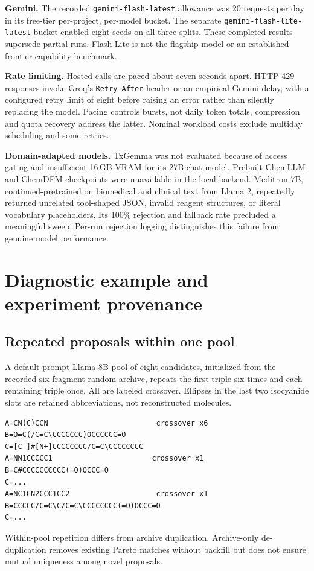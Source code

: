 \textbf{Gemini.} The recorded \texttt{gemini-flash-latest} allowance was 20 requests per day in its free-tier per-project, per-model bucket. The separate \texttt{gemini-flash-lite-latest} bucket enabled eight seeds on all three splits. These completed results supersede partial runs. Flash-Lite is not the flagship model or an established frontier-capability benchmark.

\textbf{Rate limiting.} Hosted calls are paced about seven seconds apart. HTTP 429 responses invoke Groq's \texttt{Retry-After} header or an empirical Gemini delay, with a configured retry limit of eight before raising an error rather than silently replacing the model. Pacing controls bursts, not daily token totals, compression and quota recovery address the latter. Nominal workload costs exclude multiday scheduling and some retries.

\textbf{Domain-adapted models.} TxGemma was not evaluated because of access gating and insufficient 16\,GB VRAM for its 27B chat model. Prebuilt ChemLLM and ChemDFM checkpoints were unavailable in the local backend. Meditron 7B, continued-pretrained on biomedical and clinical text from Llama 2, repeatedly returned unrelated tool-shaped JSON, invalid reagent structures, or literal vocabulary placeholders. Its 100\% rejection and fallback rate precluded a meaningful sweep. Per-run rejection logging distinguishes this failure from genuine model performance.

\section{Diagnostic example and experiment provenance}
\label{app:example}
\subsection{Repeated proposals within one pool}
A default-prompt Llama 8B pool of eight candidates, initialized from the recorded six-fragment random archive, repeats the first triple six times and each remaining triple once. All are labeled crossover. Ellipses in the last two isocyanide slots are retained abbreviations, not reconstructed molecules.
\begin{Verbatim}[fontsize=\small,breaklines,breakanywhere]
A=CN(C)CCN                         crossover x6
B=O=C(/C=C\CCCCCCC)OCCCCCC=O
C=[C-]#[N+]CCCCCCCC/C=C\CCCCCCCC
A=NN1CCCCC1                       crossover x1
B=C#CCCCCCCCCC(=O)OCCC=O
C=...
A=NC1CN2CCC1CC2                    crossover x1
B=CCCCC/C=C\C/C=C\CCCCCCCC(=O)OCCC=O
C=...
\end{Verbatim}
Within-pool repetition differs from archive duplication. Archive-only de-duplication removes existing Pareto matches without backfill but does not ensure mutual uniqueness among novel proposals.


